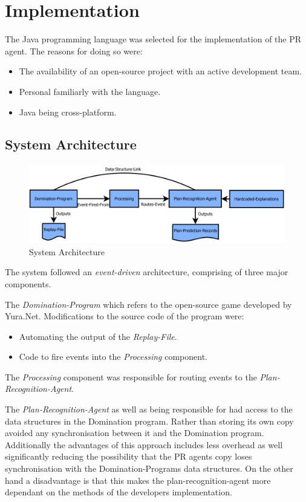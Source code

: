\documentclass[parskip]{cs4rep}
\begin{document}
\chapter{Implementation}

The Java programming language was selected for the implementation of the PR agent. The reasons for doing so were:

\begin{itemize}
\item
The availability of an open-source project with an active development team.
\item
Personal familiarly with the language.
\item
Java being cross-platform.
\end{itemize}

\section{System Architecture}

\begin{figure}[h]
\centerline{
\includegraphics[width=1.2\textwidth]{images/system-architecture}
}
\caption{System Architecture}
\end{figure} 

The system followed an \textit{event-driven} architecture, comprising of three major components.

The \textit{Domination-Program} which refers to the open-source game developed by Yura.Net. Modifications to the source code of the program were:

\begin{itemize}
\item
Automating the output of the \textit{Replay-File}.
\item
Code to fire events into the \textit{Processing} component. 
\end{itemize}

The \textit{Processing} component was responsible for routing events to the \textit{Plan-Recognition-Agent}.

The \textit{Plan-Recognition-Agent} as well as being responsible for had access to the data structures in the Domination program. Rather than storing its own copy avoided any synchronisation between it and the Domination program. Additionally the advantages of this approach includes less overhead as well significantly reducing the possibility that the PR agents copy loses synchronisation with the Domination-Programs data structures. On the other hand a disadvantage is that this makes the plan-recognition-agent more dependant on the methods of the developers implementation.
\end{document}
